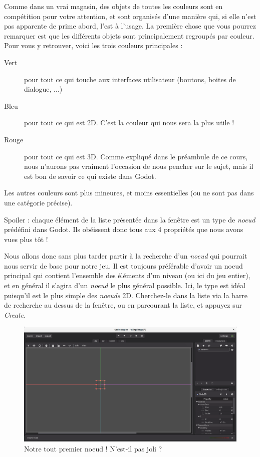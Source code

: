 Comme dans un vrai magasin, des objets de toutes les couleurs sont en compétition pour votre attention, et sont organisés d'une manière qui, si elle n'est pas apparente de prime abord, l'est à l'usage. La première chose que vous pourrez remarquer est que les différents objets sont principalement regroupés par couleur. Pour vous y retrouver, voici les trois couleurs principales :

\begin{description}
\item[Vert] pour tout ce qui touche aux interfaces utilisateur (boutons, boites de dialogue, ...)
\item[Bleu] pour tout ce qui est 2D. C'est la couleur qui nous sera la plus utile !
\item[Rouge] pour tout ce qui est 3D. Comme expliqué dans le préambule de ce cours, nous n'aurons pas vraiment l'occasion de nous pencher sur le sujet, mais il est bon de savoir ce qui existe dans Godot.
\end{description}

Les autres couleurs sont plus mineures, et moins essentielles (ou ne sont pas dans une catégorie précise).

Spoiler : chaque élément de la liste présentée dans la fenêtre est un type de \emph{noeud} prédéfini dans Godot. Ils obéissent donc tous aux 4 propriétés que nous avons vues plus tôt !

Nous allons donc sans plus tarder partir à la recherche d'un \emph{noeud} qui pourrait nous servir de base pour notre jeu. Il est toujours préférable d'avoir un noeud principal qui contient l'ensemble des éléments d'un niveau (ou ici du jeu entier), et en général il s'agira d'un \emph{noeud} le plus général possible. Ici, le type  est idéal puisqu'il est le plus simple des \emph{noeuds} 2D. Cherchez-le dans la liste via la barre de recherche au dessus de la fenêtre, ou en parcourant la liste, et appuyez sur \emph{Create}.

\begin{figure}
  \begin{center}
    \includegraphics[width=12cm]{img/lvl1-screen7.png}
  \end{center}
  \caption{\label{lvl1-screen7} Notre tout premier noeud ! N'est-il pas joli ?}
\end{figure}

